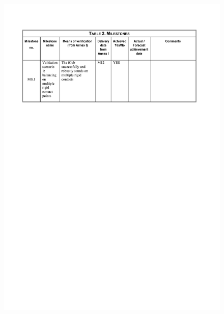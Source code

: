 \documentclass[12pt,a4paper,twoside]{article}
\begin{document}
\begin{figure}[ht!]
\centering
\includegraphics[width=\textwidth]{./images/milestones.pdf}
\end{figure}

\newpage


% 

\end{document}
